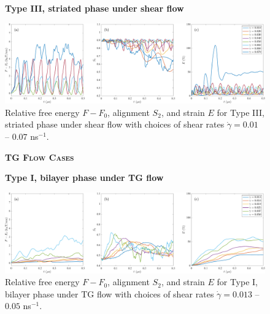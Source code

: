 \begin{figure}[h!]
\textbf{Type III, striated phase under shear flow}\par\medskip
\begin{center}
\includegraphics[width=\textwidth]{SMFigures/StShRaw.pdf}
\end{center}
\caption{
Relative free energy $F - F_0$,
alignment $S_2$, and strain $E$ for
Type III, striated phase under shear flow with choices of shear rates $\dot\gamma=0.01$ -- $0.07$ ns$^{-1}$.
}
\label{fig:stshraw}
\end{figure}

\begin{figure}[h!]
\begin{center}
\textbf{\textsc{TG Flow Cases}}\par\medskip
\textbf{Type I, bilayer  phase under TG flow}\par\medskip
\includegraphics[width=\textwidth]{SMFigures/ULTGRaw.pdf}
\end{center}
\caption{
Relative free energy $F - F_0$,
alignment $S_2$, and strain $E$ for
Type I, bilayer phase under TG flow with choices of shear rates $\dot\gamma=0.013$ -- $0.05$ ns$^{-1}$.
}
\label{fig:ultgraw}
\end{figure}



